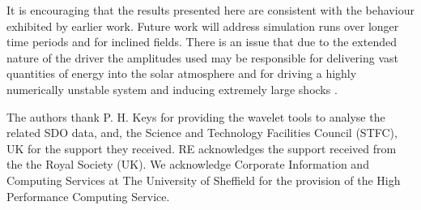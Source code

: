 \documentclass{aastex62}
\begin{document}
It is encouraging that the results presented here are consistent with the behaviour exhibited  by earlier work. Future work will address simulation runs over longer time periods and for inclined fields. There is an issue that due to the extended nature of the driver the amplitudes used may be responsible for delivering vast quantities of energy into the solar atmosphere and for driving a highly numerically unstable system and inducing extremely large shocks \citet{Santamaria2015}. 

\acknowledgments

The authors thank P. H. Keys for providing the wavelet tools to analyse the related SDO data, and, the Science and Technology Facilities Council (STFC), UK for the support they received.  RE acknowledges the support received from the the Royal Society (UK). We acknowledge Corporate Information and Computing Services at The University of Sheffield for the provision of the High Performance Computing Service.


%




\end{document}
